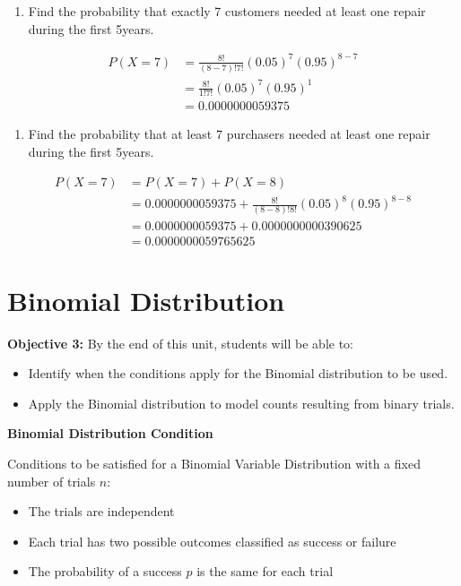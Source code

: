 \documentclass[
]{book}
\providecommand{\tightlist}{%
  \setlength{\itemsep}{0pt}\setlength{\parskip}{0pt}}
\begin{document}
\begin{enumerate}
\def\labelenumi{\arabic{enumi}.}
\tightlist
\item
  Find the probability that exactly 7 customers needed at least one repair during the first 5years.
\end{enumerate}

\[
\begin{aligned}
P(X=7)&=\frac{8!}{(8-7)!7!}(0.05)^7(0.95)^{8-7} \\
&=\frac{8!}{1!7!}(0.05)^7(0.95)^1 \\
&=0.0000000059375
\end{aligned}
\]

\begin{enumerate}
\def\labelenumi{\arabic{enumi}.}
\setcounter{enumi}{1}
\tightlist
\item
  Find the probability that at least 7 purchasers needed at least one repair during the first 5years.
\end{enumerate}

\[
\begin{aligned}
P(X=7)&=P(X=7)+P(X=8)\\
&=0.0000000059375+\frac{8!}{(8-8)!8!}(0.05)^8(0.95)^{8-8} \\
&=0.0000000059375+0.0000000000390625 \\
&=0.0000000059765625
\end{aligned}
\]

\section{Binomial Distribution}\label{binomial-distribution}

\textbf{Objective 3:} By the end of this unit, students will be able to:

\begin{itemize}
\tightlist
\item
  Identify when the conditions apply for the Binomial distribution to be used.
\item
  Apply the Binomial distribution to model counts resulting from binary trials.
\end{itemize}

\textbf{Binomial Distribution Condition}

Conditions to be satisfied for a Binomial Variable Distribution with a fixed number of trials \(n\):

\begin{itemize}
\tightlist
\item
  The trials are independent
\item
  Each trial has two possible outcomes classified as success or failure
\item
  The probability of a success \(p\) is the same for each trial
\end{itemize}
\end{document}
